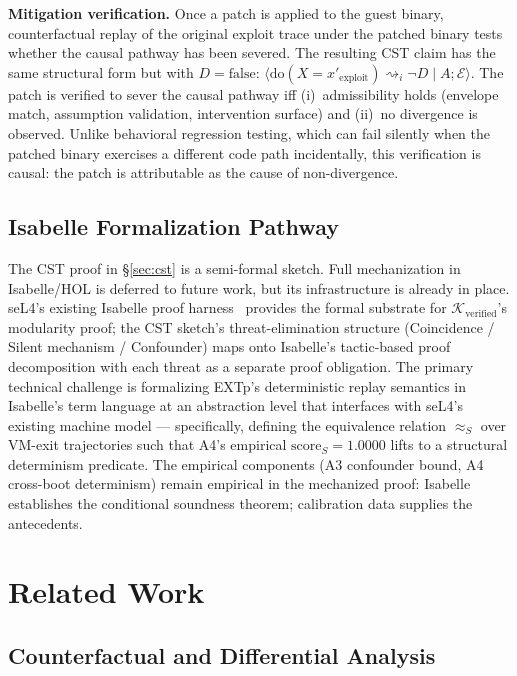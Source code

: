 \documentclass[conference]{IEEEtran}
\newcommand{\Kverified}{\mathcal{K}_\text{verified}}
\newcommand{\scoreS}{\text{score}_S}
\begin{document}
\textbf{Mitigation verification.} Once a patch is applied to the
guest binary, counterfactual replay of the original exploit trace
under the patched binary tests whether the causal pathway has
been severed. The resulting CST claim has the same structural
form but with $D = \text{false}$:
$\langle \text{do}(X{=}x'_\text{exploit}) \rightsquigarrow_i \neg D
\mid A; \mathcal{E}\rangle$. The patch is verified to sever the
causal pathway iff (i)~admissibility holds (envelope match,
assumption validation, intervention surface) and (ii)~no divergence
is observed. Unlike behavioral regression testing, which can fail
silently when the patched binary exercises a different code path
incidentally, this verification is causal: the patch is
attributable as the cause of non-divergence.

\subsection{Isabelle Formalization Pathway}\label{sec:discussion-isabelle}

The CST proof in \S\ref{sec:cst} is a semi-formal sketch. Full
mechanization in Isabelle/HOL is deferred to future work, but its
infrastructure is already in place. seL4's existing Isabelle proof
harness~\cite{klein2014sel4} provides the formal substrate for
$\Kverified$'s modularity proof; the CST sketch's
threat-elimination structure (Coincidence / Silent mechanism /
Confounder) maps onto Isabelle's tactic-based proof decomposition
with each threat as a separate proof obligation. The primary
technical challenge is formalizing EXTp's deterministic replay
semantics in Isabelle's term language at an abstraction level that
interfaces with seL4's existing machine model --- specifically,
defining the equivalence relation $\approx_S$ over VM-exit
trajectories such that A4's empirical $\scoreS{=}1.0000$ lifts to
a structural determinism predicate. The empirical components (A3
confounder bound, A4 cross-boot determinism) remain empirical in
the mechanized proof: Isabelle establishes the conditional
soundness theorem; calibration data supplies the antecedents.

\section{Related Work}\label{sec:related}

\subsection{Counterfactual and Differential Analysis}
\end{document}
